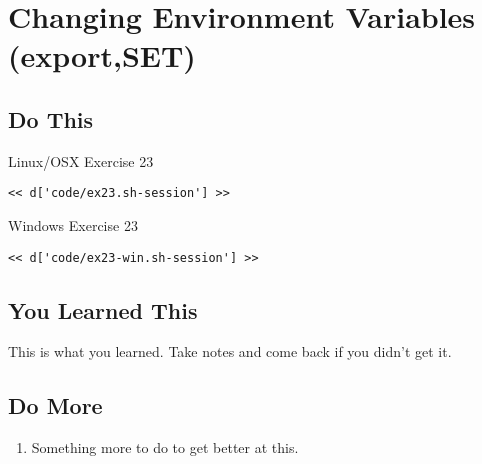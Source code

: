 \chapter{Changing Environment Variables (export,SET)}

\section{Do This}

\begin{code}{Linux/OSX Exercise 23}
\begin{Verbatim}
<< d['code/ex23.sh-session'] >>
\end{Verbatim}
\end{code}

\begin{code}{Windows Exercise 23}
\begin{Verbatim}
<< d['code/ex23-win.sh-session'] >>
\end{Verbatim}
\end{code}

\section{You Learned This}

This is what you learned.  Take notes and come back if you didn't get it.

\section{Do More}

\begin{enumerate}
\item Something more to do to get better at this.
\end{enumerate}

